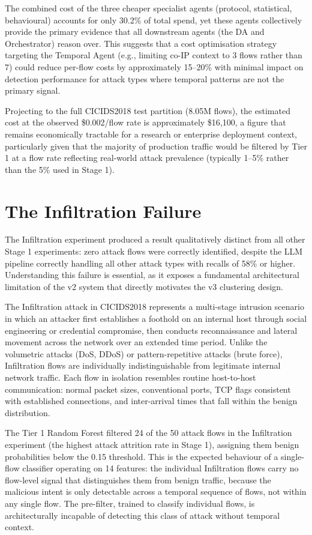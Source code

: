 The combined cost of the three cheaper specialist agents (protocol, statistical, behavioural) accounts for only 30.2\% of total spend, yet these agents collectively provide the primary evidence that all downstream agents (the DA and Orchestrator) reason over. This suggests that a cost optimisation strategy targeting the Temporal Agent (e.g., limiting co-IP context to 3 flows rather than 7) could reduce per-flow costs by approximately 15--20\% with minimal impact on detection performance for attack types where temporal patterns are not the primary signal.

Projecting to the full CICIDS2018 test partition (8.05M flows), the estimated cost at the observed \$0.002/flow rate is approximately \$16,100, a figure that remains economically tractable for a research or enterprise deployment context, particularly given that the majority of production traffic would be filtered by Tier 1 at a flow rate reflecting real-world attack prevalence (typically 1--5\% rather than the 5\% used in Stage 1).

\section{The Infiltration Failure}
\label{sec:infiltration-failure}

The Infiltration experiment produced a result qualitatively distinct from all other Stage 1 experiments: zero attack flows were correctly identified, despite the LLM pipeline correctly handling all other attack types with recalls of 58\% or higher. Understanding this failure is essential, as it exposes a fundamental architectural limitation of the v2 system that directly motivates the v3 clustering design.

The Infiltration attack in CICIDS2018 represents a multi-stage intrusion scenario in which an attacker first establishes a foothold on an internal host through social engineering or credential compromise, then conducts reconnaissance and lateral movement across the network over an extended time period. Unlike the volumetric attacks (DoS, DDoS) or pattern-repetitive attacks (brute force), Infiltration flows are individually indistinguishable from legitimate internal network traffic. Each flow in isolation resembles routine host-to-host communication: normal packet sizes, conventional ports, TCP flags consistent with established connections, and inter-arrival times that fall within the benign distribution.

The Tier 1 Random Forest filtered 24 of the 50 attack flows in the Infiltration experiment (the highest attack attrition rate in Stage 1), assigning them benign probabilities below the 0.15 threshold. This is the expected behaviour of a single-flow classifier operating on 14 features: the individual Infiltration flows carry no flow-level signal that distinguishes them from benign traffic, because the malicious intent is only detectable across a temporal sequence of flows, not within any single flow. The pre-filter, trained to classify individual flows, is architecturally incapable of detecting this class of attack without temporal context.

